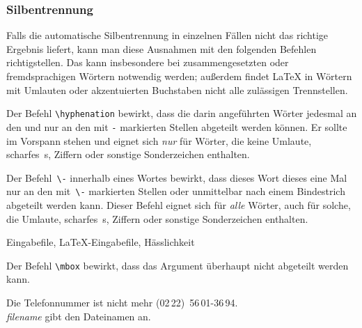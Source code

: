  
\subsubsection{Silbentrennung} \label{silb}
 
Falls die automatische Silbentrennung in einzelnen Fällen nicht
das richtige Ergebnis liefert, kann man diese Ausnahmen mit den
folgenden Befehlen richtigstellen.
Das kann insbesondere bei zusammengesetzten oder fremdsprachigen
Wörtern notwendig werden; außerdem findet \LaTeX{} in Wörtern
mit Umlauten oder akzentuierten Buchstaben nicht alle zulässigen
Trennstellen.
 
Der Befehl \lstinline|\hyphenation| bewirkt, dass die darin
angeführten Wörter jedesmal an den und nur an den mit
\lstinline|-| markierten Stellen abgeteilt werden können.
Er sollte im Vorspann stehen und eignet sich
\emph{nur} für Wörter, die keine Umlaute, scharfes~s,
Ziffern oder sonstige Sonderzeichen enthalten.
\begin{example}
\end{example}

 
Der Befehl~\lstinline|\-| innerhalb eines Wortes bewirkt, dass dieses
Wort dieses eine Mal nur an den mit~\lstinline|\-|
markierten Stellen 
oder unmittelbar nach einem Bindestrich
abgeteilt werden kann.
Dieser Befehl eignet sich für \emph{alle} Wörter, auch für
solche, die Umlaute, scharfes~s, Ziffern oder sonstige
Sonderzeichen enthalten.
\begin{LTXexample}
Ein\-gabe\-file,
\LaTeX-Eingabe\-file,
Häss\-lich\-keit
\end{LTXexample}

Der Befehl \lstinline|\mbox| bewirkt, dass das Argument überhaupt nicht
abgeteilt werden kann.

\begin{LTXexample}
Die Telefonnummer ist nicht mehr
\mbox{(02\,22) 56\,01-36\,94}. \\
\mbox{\textit{filename}} gibt den 
Dateinamen an.
\end{LTXexample}

